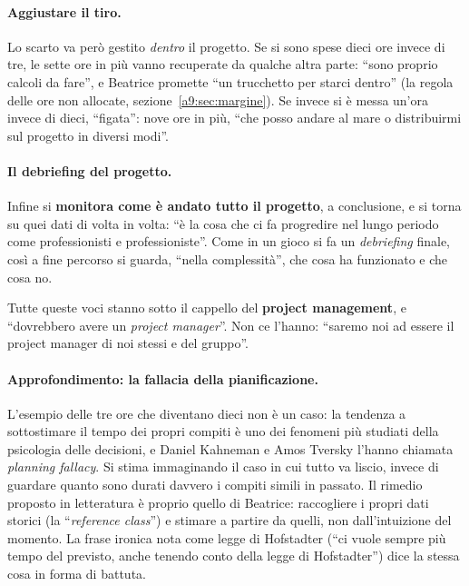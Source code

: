 \paragraph{Aggiustare il tiro.} Lo scarto va però gestito \emph{dentro} il progetto.
Se si sono spese dieci ore invece di tre, le sette ore in più vanno recuperate da
qualche altra parte: ``sono proprio calcoli da fare'', e Beatrice promette ``un
trucchetto per starci dentro'' (la regola delle ore non allocate,
sezione~\ref{a9:sec:margine}). Se invece si è messa un'ora invece di dieci,
``figata'': nove ore in più, ``che posso andare al mare o distribuirmi sul progetto in
diversi modi''.

\paragraph{Il debriefing del progetto.} Infine si \textbf{monitora come è andato
tutto il progetto}, a conclusione, e si torna su quei dati di volta in volta: ``è la
cosa che ci fa progredire nel lungo periodo come professionisti e professioniste''.
Come in un gioco si fa un \emph{debriefing} finale, così a fine percorso si guarda,
``nella complessità'', che cosa ha funzionato e che cosa no.

Tutte queste voci stanno sotto il cappello del \textbf{project management}, e
``dovrebbero avere un \emph{project manager}''. Non ce l'hanno: ``saremo noi ad
essere il project manager di noi stessi e del gruppo''.

\paragraph{Approfondimento: la fallacia della pianificazione.} L'esempio delle tre
ore che diventano dieci non è un caso: la tendenza a sottostimare il tempo dei propri
compiti è uno dei fenomeni più studiati della psicologia delle decisioni, e Daniel
Kahneman e Amos Tversky l'hanno chiamata \emph{planning fallacy}. Si stima
immaginando il caso in cui tutto va liscio, invece di guardare quanto sono durati
davvero i compiti simili in passato. Il rimedio proposto in letteratura è proprio
quello di Beatrice: raccogliere i propri dati storici (la ``\emph{reference class}'')
e stimare a partire da quelli, non dall'intuizione del momento. La frase ironica nota
come legge di Hofstadter (``ci vuole sempre più tempo del previsto, anche tenendo conto
della legge di Hofstadter'') dice la stessa cosa in forma di battuta.

